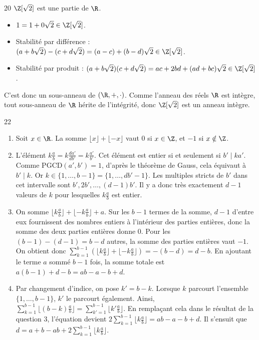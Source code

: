 \begin{correction}{20}
$\Z[\sqrt{2}]$ est une partie de $\R$. 
\begin{itemize}
 \item $1 = 1 + 0\sqrt{2} \in \Z[\sqrt{2}]$. 
 \item Stabilité par différence : $(a+b\sqrt{2}) - (c+d\sqrt{2}) = (a-c) + (b-d)\sqrt{2} \in \Z[\sqrt{2}]$. 
 \item Stabilité par produit : $(a+b\sqrt{2})(c+d\sqrt{2}) = ac + 2bd + (ad+bc)\sqrt{2} \in \Z[\sqrt{2}]$. 
\end{itemize}
C'est donc un sous-anneau de $(\R, +, \cdot)$. 
Comme l'anneau des réels $\R$ est intègre, tout sous-anneau de $\R$ hérite de l'intégrité, donc $\Z[\sqrt{2}]$ est un anneau intègre. 
\end{correction}

\begin{correction}{22}
\begin{enumerate}
 \item Soit $x \in \R$. La somme $\lfloor x \rfloor + \lfloor -x \rfloor$ vaut $0$ si $x \in \Z$, et $-1$ si $x \notin \Z$. 
 \item L'élément $k\frac{a}{b} = k\frac{da'}{db'} = k\frac{a'}{b'}$. Cet élément est entier si et seulement si $b' \mid k a'$. 
 Comme $\text{PGCD}(a',b')=1$, d'après le théorème de Gauss, cela équivaut à $b' \mid k$. 
 Or $k \in \{1, \dots, b-1\} = \{1, \dots, db'-1\}$. Les multiples stricts de $b'$ dans cet intervalle sont $b', 2b', \dots, (d-1)b'$. 
 Il y a donc très exactement $d-1$ valeurs de $k$ pour lesquelles $k\frac{a}{b}$ est entier. 
 \item On somme $\lfloor k\frac{a}{b} \rfloor + \lfloor -k\frac{a}{b} \rfloor + a$.
 Sur les $b-1$ termes de la somme, $d-1$ d'entre eux fournissent des nombres entiers à l'intérieur des parties entières, donc la somme des deux parties entières donne 0. Pour les $(b-1)-(d-1) = b-d$ autres, la somme des parties entières vaut $-1$. 
 On obtient donc $\sum_{k=1}^{b-1} \left( \lfloor k\frac{a}{b} \rfloor + \lfloor -k\frac{a}{b} \rfloor \right) = - (b-d) = d-b$. 
 En ajoutant le terme $a$ sommé $b-1$ fois, la somme totale est $a(b-1) + d - b = ab - a - b + d$. 
 \item Par changement d'indice, on pose $k' = b-k$. Lorsque $k$ parcourt l'ensemble $\{1, \dots, b-1\}$, $k'$ le parcourt également. 
 Ainsi, $\sum_{k=1}^{b-1} \lfloor (b-k)\frac{a}{b} \rfloor = \sum_{k'=1}^{b-1} \lfloor k'\frac{a}{b} \rfloor$. 
 En remplaçant cela dans le résultat de la question 3, l'équation devient $2 \sum_{k=1}^{b-1} \lfloor k\frac{a}{b} \rfloor = ab - a - b + d$. 
 Il s'ensuit que $d = a + b - ab + 2 \sum_{k=1}^{b-1} \lfloor k\frac{a}{b} \rfloor$. 
\end{enumerate}
\end{correction}

